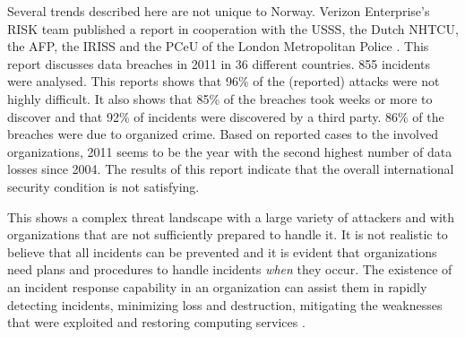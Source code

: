 Several trends described here are not unique to Norway. Verizon Enterprise's RISK team published a report in cooperation with the \ac{USSS}, the Dutch \ac{NHTCU}, the \ac{AFP}, the \ac{IRISS} and the \ac{PCeU} of the London Metropolitan Police \cite{VerizonReport}. This report discusses data breaches in 2011 in 36 different countries. 855 incidents were analysed. This reports shows that 96\% of the (reported) attacks were not highly difficult. It also shows that 85\% of the breaches took weeks or more to discover and that 92\% of incidents were discovered by a third party. 86\% of the breaches were due to organized crime. Based on reported cases to the involved organizations, 2011 seems to be the year with the second highest number of data losses since 2004. The results of this report indicate that the overall international security condition is not satisfying.

This shows a complex threat landscape with a large variety of attackers and with organizations that are not sufficiently prepared to handle it. It is not realistic to believe that all incidents can be prevented and it is evident that organizations need plans and procedures to handle incidents \textit{when} they occur. The existence of an incident response capability in an organization can assist them in rapidly detecting incidents, minimizing loss and destruction, mitigating the weaknesses that were exploited and restoring computing services \cite{nist800-61}. 

